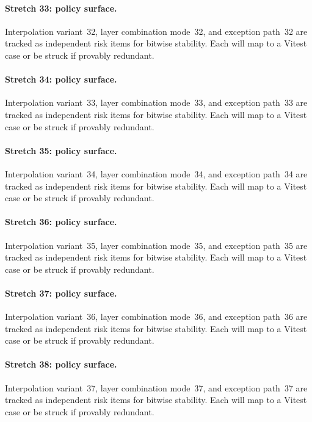 \documentclass[sigconf,nonacm]{acmart}
\begin{document}
\paragraph{Stretch 33: policy surface.}
Interpolation variant~32, layer combination mode~32, and exception path~32 are tracked as independent risk items for bitwise stability. Each will map to a Vitest case or be struck if provably redundant. %

\paragraph{Stretch 34: policy surface.}
Interpolation variant~33, layer combination mode~33, and exception path~33 are tracked as independent risk items for bitwise stability. Each will map to a Vitest case or be struck if provably redundant. %

\paragraph{Stretch 35: policy surface.}
Interpolation variant~34, layer combination mode~34, and exception path~34 are tracked as independent risk items for bitwise stability. Each will map to a Vitest case or be struck if provably redundant. %

\paragraph{Stretch 36: policy surface.}
Interpolation variant~35, layer combination mode~35, and exception path~35 are tracked as independent risk items for bitwise stability. Each will map to a Vitest case or be struck if provably redundant. %

\paragraph{Stretch 37: policy surface.}
Interpolation variant~36, layer combination mode~36, and exception path~36 are tracked as independent risk items for bitwise stability. Each will map to a Vitest case or be struck if provably redundant. %

\paragraph{Stretch 38: policy surface.}
Interpolation variant~37, layer combination mode~37, and exception path~37 are tracked as independent risk items for bitwise stability. Each will map to a Vitest case or be struck if provably redundant. %
\end{document}
